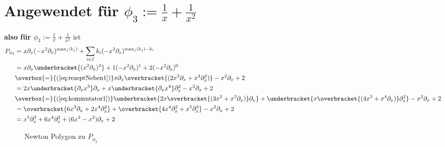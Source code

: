 \section{Angewendet für $\phi_3:=\frac{1}{x}+\frac{1}{x^2}$}
\textbf{also für $\phi_3:=\frac{1}{x}+\frac{1}{x^2}$} ist
\begin{align*}
P_{\phi_3} &=x\partial_x(-x^2\partial_x)^{\max_j(k_j)}
             +\sum_{i\in I} k_i(-x^2\partial_x)^{\max_j(k_j)-k_i}\\
           &=x\partial_x\underbracket{(x^2\partial_x)^{2}}
             +1(-x^2\partial_x)^{1}+2(-x^2\partial_x)^{0}\\
           &\overbox{=}{(\ref{eq:rezeptNeben1})}
             x\partial_x \overbracket{(2x^3\partial_x+x^4\partial_x^2)}
             -x^2\partial_x+2\\
           &=2x\underbracket{\partial_xx^3}\partial_x
             +x\underbracket{\partial_xx^4}\partial_x^2
             -x^2\partial_x+2\\
           &\overbox{=}{(\ref{eq:kommutator1})}
             \underbracket{2x\overbracket{(3x^2+x^3\partial_x)}\partial_x}
             +\underbracket{x\overbracket{(4x^3+x^4\partial_x)}\partial_x^2}
             -x^2\partial_x+2\\
           &=\overbracket{6x^3\partial_x+2x^4\partial_x^2}
             +\overbracket{4x^4\partial_x^2+x^5\partial_x^3}
             -x^2\partial_x+2\\
           &= x^5\partial_x^3+6x^4\partial_x^2+(6x^3-x^2)\partial_x+2
\end{align*}
\begin{figure}[H]
\caption{Newton Polygon zu $P_{\phi_3}$}
\begin{center}
\end{center}
\end{figure}

